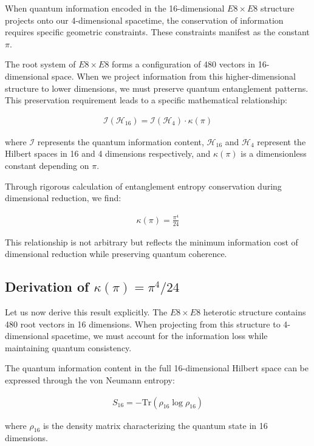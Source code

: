 \documentclass[11pt,english,twoside]{article}
\begin{document}
When quantum information encoded in the 16-dimensional $E8\times E8$ structure projects onto our 4-dimensional spacetime, the conservation of information requires specific geometric constraints. These constraints manifest as the constant $\pi$.

The root system of $E8\times E8$ forms a configuration of 480 vectors in 16-dimensional space. When we project information from this higher-dimensional structure to lower dimensions, we must preserve quantum entanglement patterns. This preservation requirement leads to a specific mathematical relationship:

\begin{align}
    \mathcal{I}(\mathcal{H}_{16}) = \mathcal{I}(\mathcal{H}_4) \cdot \kappa(\pi)
\end{align}

where $\mathcal{I}$ represents the quantum information content, $\mathcal{H}_{16}$ and $\mathcal{H}_4$ represent the Hilbert spaces in 16 and 4 dimensions respectively, and $\kappa(\pi)$ is a dimensionless constant depending on $\pi$.

Through rigorous calculation of entanglement entropy conservation during dimensional reduction, we find:

\begin{align}
    \kappa(\pi) = \frac{\pi^4}{24}
\end{align}

This relationship is not arbitrary but reflects the minimum information cost of dimensional reduction while preserving quantum coherence.

\subsection{Derivation of $\kappa(\pi) = \pi^4/24$}

Let us now derive this result explicitly. The $E8 \times E8$ heterotic structure contains 480 root vectors in 16 dimensions. When projecting from this structure to 4-dimensional spacetime, we must account for the information loss while maintaining quantum consistency.

The quantum information content in the full 16-dimensional Hilbert space can be expressed through the von Neumann entropy:

\begin{align}
    S_{16} = -\text{Tr}(\rho_{16} \log \rho_{16})
\end{align}

where $\rho_{16}$ is the density matrix characterizing the quantum state in 16 dimensions.
\end{document}
